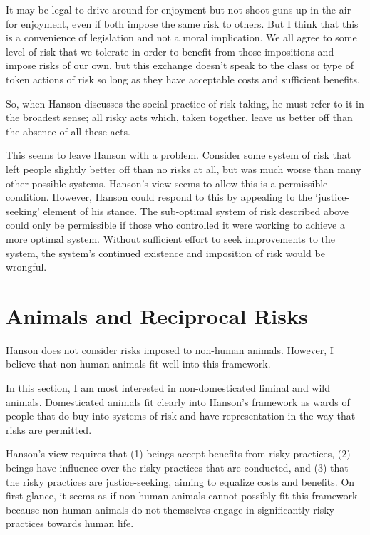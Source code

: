 It may be legal to drive around for enjoyment but not shoot guns up in the air
for enjoyment, even if both impose the same risk to others. But I think that
this is a convenience of legislation and not a moral implication. We all agree
to some level of risk that we tolerate in order to benefit from those
impositions and impose risks of our own, but this exchange doesn’t speak to the
class or type of token actions of risk so long as they have acceptable costs
and sufficient benefits.

So, when Hanson discusses the social practice of risk-taking, he must refer to
it in the broadest sense; all risky acts which, taken together, leave us better
off than the absence of all these acts.

This seems to leave Hanson with a problem. Consider some system of risk that
left people slightly better off than no risks at all, but was much worse than
many other possible systems. Hanson’s view seems to allow this is a permissible
condition. However, Hanson could respond to this by appealing to the
‘justice-seeking’ element of his stance. The sub-optimal system of risk
described above could only be permissible if those who controlled it were
working to achieve a more optimal system. Without sufficient effort to seek
improvements to the system, the system’s continued existence and imposition of
risk would be wrongful.

\section{Animals and Reciprocal Risks}

Hanson does not consider risks imposed to non-human animals. However, I believe
that non-human animals fit well into this framework.

In this section, I am most interested in non-domesticated liminal and wild
animals. Domesticated animals fit clearly into Hanson’s framework as wards of
people that do buy into systems of risk and have representation in the way that
risks are permitted.

Hanson’s view requires that (1) beings accept benefits from risky practices,
(2) beings have influence over the risky practices that are conducted, and (3)
that the risky practices are justice-seeking, aiming to equalize costs and
benefits.  On first glance, it seems as if non-human animals cannot possibly
fit this framework because non-human animals do not themselves engage in
significantly risky practices towards human life.

